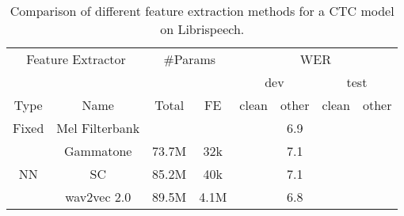 
\begin{table}[htbp]

\centering
\caption{Comparison of different feature extraction methods for a CTC model on Librispeech.}
\label{table:features_general}
\begin{tabular}{|c|c|c|c|c|c|c|c|}
\hline
\multicolumn{2}{|c|}{Feature Extractor} & \multicolumn{2}{c|}{\#Params} & \multicolumn{4}{c|}{{WER}} \\\cline{5-8}
                 \multicolumn{2}{|c|}{} &         \multicolumn{2}{c|}{} & \multicolumn{2}{c|}{{dev}} & \multicolumn{2}{c|}{{test}} \\\hline
                                   Type &           Name &                         Total &   FE &                    {clean} & other &                     {clean} & other \\\hline\hline
                                  Fixed & Mel Filterbank &                               &      &                            &   6.9 &                             &       \\\cline{2-8}
                                        &      Gammatone &                         73.7M &  32k &                            &   7.1 &                             &       \\\hline
                                     NN &             SC &                         85.2M &  40k &                            &   7.1 &                             &       \\\cline{2-8}
                                        &    wav2vec 2.0 &                         89.5M & 4.1M &                            &   6.8 &                             &       \\
\hline
\end{tabular}

\end{table}
